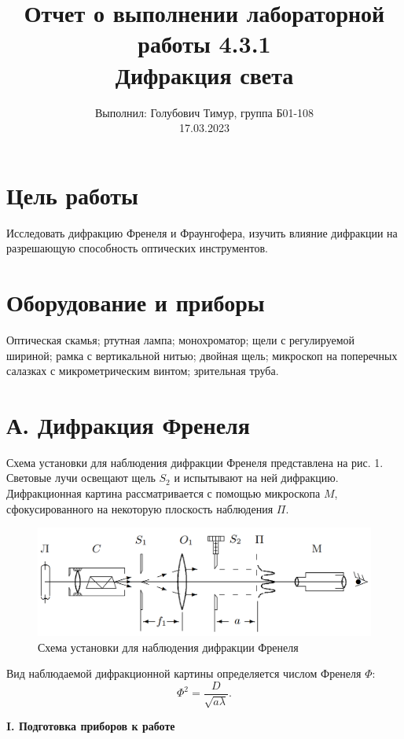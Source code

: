 \documentclass[12pt,a4paper]{article}
\author{\normalsize Выполнил: Голубович Тимур, группа Б01-108 \\
    	\normalsize 17.03.2023}
\date{}
\title{
    	\large Отчет о выполнении лабораторной работы 4.3.1 \\
    	\Large Дифракция света \\
    }
\begin{document}
    	\maketitle
    	
    \section*{Цель работы}
    Исследовать дифракцию Френеля и Фраунгофера, изучить влияние дифракции на разрешающую способность оптических инструментов.
    
    
    \section*{Оборудование и приборы} 
    Оптическая скамья;
    ртутная лампа;
    монохроматор;
    щели с регулируемой шириной;
    рамка с вертикальной нитью;
    двойная щель;
    микроскоп на поперечных салазках с микрометрическим винтом;
    зрительная труба.

	
\section*{А. Дифракция Френеля}
	Схема установки для наблюдения дифракции Френеля представлена на рис. 1. Световые лучи освещают щель $S_2$ и испытывают на ней дифракцию. Дифракционная картина рассматривается с помощью микроскопа $M$, сфокусированного на некоторую плоскость наблюдения $\Pi$.
	
	\begin{figure}[h!]
		\centering
		\includegraphics[scale=0.6]{res/Frenel}
		\caption{Схема установки для наблюдения дифракции Френеля}
	\end{figure}

	Вид наблюдаемой дифракционной картины определяется числом Френеля $\Phi$:
	\begin{equation*}
		\Phi ^2 = \frac{D}{\sqrt{a\lambda}}.
	\end{equation*}

    \newpage
	\begin{center}
		\textbf{I. Подготовка приборов к работе}
	\end{center}
\end{document}
